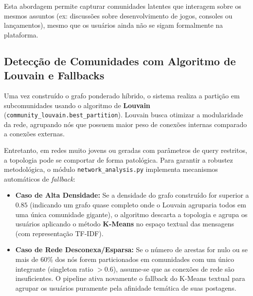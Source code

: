 \documentclass[12pt,a4paper]{article}
\begin{document}
Esta abordagem permite capturar comunidades latentes que interagem sobre os mesmos assuntos (ex: discussões sobre desenvolvimento de jogos, consoles ou lançamentos), mesmo que os usuários ainda não se sigam formalmente na plataforma.

\subsection{Detecção de Comunidades com Algoritmo de Louvain e Fallbacks}
Uma vez construído o grafo ponderado híbrido, o sistema realiza a partição em subcomunidades usando o algoritmo de \textbf{Louvain} (\texttt{community\_louvain.best\_partition}). Louvain busca otimizar a modularidade da rede, agrupando nós que possuem maior peso de conexões internas comparado a conexões externas. 

Entretanto, em redes muito jovens ou geradas com parâmetros de query restritos, a topologia pode se comportar de forma patológica. Para garantir a robustez metodológica, o módulo \texttt{network\_analysis.py} implementa mecanismos automáticos de \textit{fallback}:
\begin{itemize}
    \item \textbf{Caso de Alta Densidade:} Se a densidade do grafo construído for superior a $0.85$ (indicando um grafo quase completo onde o Louvain agruparia todos em uma única comunidade gigante), o algoritmo descarta a topologia e agrupa os usuários aplicando o método \textbf{K-Means} no espaço textual das mensagens (com representação TF-IDF).
    \item \textbf{Caso de Rede Desconexa/Esparsa:} Se o número de arestas for nulo ou se mais de 60\% dos nós forem particionados em comunidades com um único integrante (singleton ratio $> 0.6$), assume-se que as conexões de rede são insuficientes. O pipeline ativa novamente o fallback do K-Means textual para agrupar os usuários puramente pela afinidade temática de suas postagens.
\end{itemize}
\end{document}
